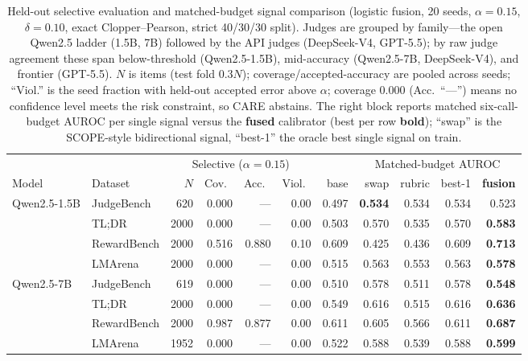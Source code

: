 \begin{table}[t]
\centering
\small
\setlength{\tabcolsep}{4pt}
\caption{Held-out selective evaluation and matched-budget signal comparison (logistic fusion, 20 seeds, $\alpha{=}0.15$, $\delta{=}0.10$, exact Clopper--Pearson, strict 40/30/30 split). Judges are grouped by family---the open Qwen2.5 ladder (1.5B, 7B) followed by the API judges (DeepSeek-V4, GPT-5.5); by raw judge agreement these span below-threshold (Qwen2.5-1.5B), mid-accuracy (Qwen2.5-7B, DeepSeek-V4), and frontier (GPT-5.5). $N$ is items (test fold $0.3N$); coverage/accepted-accuracy are pooled across seeds; ``Viol.'' is the seed fraction with held-out accepted error above $\alpha$; coverage $0.000$ (Acc.\ ``---'') means no confidence level meets the risk constraint, so CARE abstains. The right block reports matched six-call-budget AUROC per single signal versus the \textbf{fused} calibrator (best per row \textbf{bold}); ``swap'' is the SCOPE-style bidirectional signal, ``best-1'' the oracle best single signal on train.}
\label{tab:main}
\begin{tabular}{ll rrrr r rrrr}
\toprule
& & \multicolumn{4}{c}{Selective ($\alpha{=}0.15$)} & & \multicolumn{4}{c}{Matched-budget AUROC} \\
\cmidrule(lr){3-6}\cmidrule(lr){8-11}
Model & Dataset & $N$ & Cov.\ & Acc.\ & Viol.\ & base & swap & rubric & best-1 & \textbf{fusion} \\
\midrule
\multirow{4}{*}{Qwen2.5-1.5B} & JudgeBench & 620 & 0.000 & --- & 0.00 & 0.497 & \textbf{0.534} & 0.534 & 0.534 & 0.523 \\
 & TL;DR & 2000 & 0.000 & --- & 0.00 & 0.503 & 0.570 & 0.535 & 0.570 & \textbf{0.583} \\
 & RewardBench & 2000 & 0.516 & 0.880 & 0.10 & 0.609 & 0.425 & 0.436 & 0.609 & \textbf{0.713} \\
 & LMArena & 2000 & 0.000 & --- & 0.00 & 0.515 & 0.563 & 0.553 & 0.563 & \textbf{0.578} \\
\midrule
\multirow{4}{*}{Qwen2.5-7B} & JudgeBench & 619 & 0.000 & --- & 0.00 & 0.510 & 0.578 & 0.511 & 0.578 & \textbf{0.548} \\
 & TL;DR & 2000 & 0.000 & --- & 0.00 & 0.549 & 0.616 & 0.515 & 0.616 & \textbf{0.636} \\
 & RewardBench & 2000 & 0.987 & 0.877 & 0.00 & 0.611 & 0.605 & 0.566 & 0.611 & \textbf{0.687} \\
 & LMArena & 1952 & 0.000 & --- & 0.00 & 0.522 & 0.588 & 0.539 & 0.588 & \textbf{0.599} \\
\midrule

\end{tabular}
\end{table}
